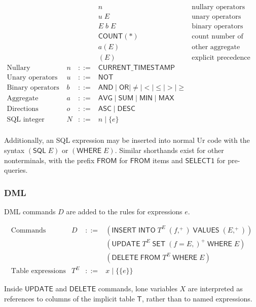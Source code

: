 \documentclass{article}
\newcommand{\mt}[1]{\mathsf{#1}}
\begin{document}
$$\begin{array}{rrcll}
  &&& n & \textrm{nullary operators} \\
  &&& u \; E & \textrm{unary operators} \\
  &&& E \; b \; E & \textrm{binary operators} \\
  &&& \mt{COUNT}(\ast) & \textrm{count number of rows} \\
  &&& a(E) & \textrm{other aggregate function} \\
  &&& (E) & \textrm{explicit precedence} \\
  \textrm{Nullary operators} & n &::=& \mt{CURRENT\_TIMESTAMP} \\
  \textrm{Unary operators} & u &::=& \mt{NOT} \\
  \textrm{Binary operators} & b &::=& \mt{AND} \mid \mt{OR} \mid \neq \mid < \mid \leq \mid > \mid \geq \\
  \textrm{Aggregate functions} & a &::=& \mt{AVG} \mid \mt{SUM} \mid \mt{MIN} \mid \mt{MAX} \\
  \textrm{Directions} & o &::=& \mt{ASC} \mid \mt{DESC} \\
  \textrm{SQL integer} & N &::=& n \mid \{e\} \\
\end{array}$$

Additionally, an SQL expression may be inserted into normal Ur code with the syntax $(\mt{SQL} \; E)$ or $(\mt{WHERE} \; E)$.  Similar shorthands exist for other nonterminals, with the prefix $\mt{FROM}$ for $\mt{FROM}$ items and $\mt{SELECT1}$ for pre-queries.

\subsubsection{DML}

DML commands $D$ are added to the rules for expressions $e$.

$$\begin{array}{rrcll}
  \textrm{Commands} & D &::=& (\mt{INSERT} \; \mt{INTO} \; T^E \; (f,^+) \; \mt{VALUES} \; (E,^+)) \\
  &&& (\mt{UPDATE} \; T^E \; \mt{SET} \; (f = E,)^+ \; \mt{WHERE} \; E) \\
  &&& (\mt{DELETE} \; \mt{FROM} \; T^E \; \mt{WHERE} \; E) \\
  \textrm{Table expressions} & T^E &::=& x \mid \{\{e\}\}
\end{array}$$

Inside $\mt{UPDATE}$ and $\mt{DELETE}$ commands, lone variables $X$ are interpreted as references to columns of the implicit table $\mt{T}$, rather than to named expressions.
\end{document}
